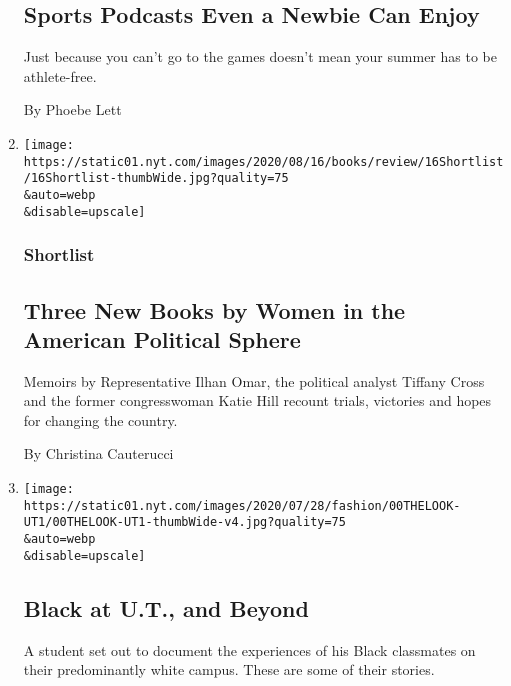 \begin{enumerate}
  \hypertarget{sports-podcasts-even-a-newbie-can-enjoy}{%
  \subsection{Sports Podcasts Even a Newbie Can
  Enjoy}\label{sports-podcasts-even-a-newbie-can-enjoy}}

  Just because you can't go to the games doesn't mean your summer has to
  be athlete-free.

  By Phoebe Lett
\item
  \href{/2020/08/08/books/review/katie-hill-she-will-rise-ilhan-omar-tiffany-cross.html}{}

  \texttt{[image: https://static01.nyt.com/images/2020/08/16/books/review/16Shortlist/16Shortlist-thumbWide.jpg?quality=75\\\&auto=webp\\\&disable=upscale]}

  \hypertarget{shortlist}{%
  \subsubsection{Shortlist}\label{shortlist}}

  \hypertarget{three-new-books-by-women-in-the-american-political-sphere}{%
  \subsection{Three New Books by Women in the American Political
  Sphere}\label{three-new-books-by-women-in-the-american-political-sphere}}

  Memoirs by Representative Ilhan Omar, the political analyst Tiffany
  Cross and the former congresswoman Katie Hill recount trials,
  victories and hopes for changing the country.

  By Christina Cauterucci
\item
  \href{/2020/08/08/style/black-yearbook-university-texas-austin.html}{}

  \texttt{[image: https://static01.nyt.com/images/2020/07/28/fashion/00THELOOK-UT1/00THELOOK-UT1-thumbWide-v4.jpg?quality=75\\\&auto=webp\\\&disable=upscale]}

  \hypertarget{black-at-ut-and-beyond}{%
  \subsection{Black at U.T., and Beyond}\label{black-at-ut-and-beyond}}

  A student set out to document the experiences of his Black classmates
  on their predominantly white campus. These are some of their stories.


\end{enumerate}
